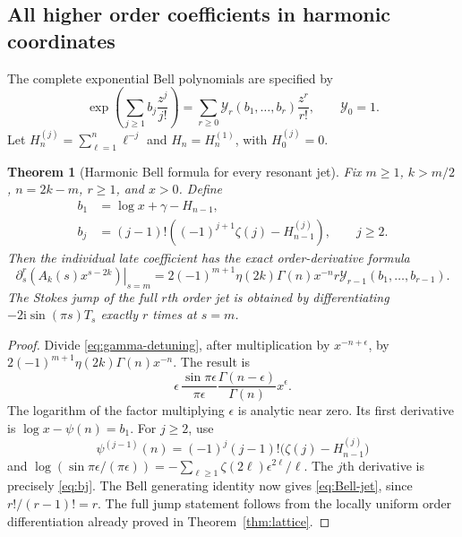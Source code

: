 \documentclass[11pt,a4paper]{article}
\newtheorem{theorem}{Theorem}[section]
\theoremstyle{definition}\newtheorem{definition}[theorem]{Definition}
\theoremstyle{remark}\newtheorem{remark}[theorem]{Remark}
\newcommand{\Bell}{\mathcal Y}
\newcommand{\ii}{\mathrm i}
\numberwithin{equation}{section}
\begin{document}
\subsection{All higher order coefficients in harmonic coordinates}

The complete exponential Bell polynomials are specified by
\begin{equation}\label{eq:Bell-def}
 \exp\left(\sum_{j\ge1}b_j\frac{z^j}{j!}\right)
       =\sum_{r\ge0}\Bell_r(b_1,\ldots,b_r)\frac{z^r}{r!},
 \qquad \Bell_0=1.
\end{equation}
Let $H_n^{(j)}=\sum_{\ell=1}^n\ell^{-j}$ and $H_n=H_n^{(1)}$, with
$H_0^{(j)}=0$.

\begin{theorem}[Harmonic Bell formula for every resonant jet]\label{thm:Bell}
Fix $m\ge1$, $k>m/2$, $n=2k-m$, $r\ge1$, and $x>0$. Define
\begin{align}
 b_1&=\log x+\gamma-H_{n-1},\label{eq:b1}\\
 b_j&=(j-1)!\left((-1)^{j+1}\zeta(j)-H_{n-1}^{(j)}\right),
                  \qquad j\ge2.\label{eq:bj}
\end{align}
Then the individual late coefficient has the exact order-derivative formula
\begin{equation}\label{eq:Bell-jet}
 \left.\partial_s^r\!\left(A_k(s)x^{s-2k}\right)\right|_{s=m}
  =2(-1)^{m+1}\eta(2k)\Gamma(n)x^{-n}
       r\Bell_{r-1}(b_1,\ldots,b_{r-1}).
\end{equation}
The Stokes jump of the full $r$th order jet is obtained by differentiating
$-2\ii\sin(\pi s)T_s$ exactly $r$ times at $s=m$.
\end{theorem}
\begin{proof}
Divide \eqref{eq:gamma-detuning}, after multiplication by $x^{-n+\epsilon}$,
by $2(-1)^{m+1}\eta(2k)\Gamma(n)x^{-n}$. The result is
\[
 \epsilon\,\frac{\sin\pi\epsilon}{\pi\epsilon}
        \frac{\Gamma(n-\epsilon)}{\Gamma(n)}x^\epsilon.
\]
The logarithm of the factor multiplying $\epsilon$ is analytic near zero.
Its first derivative is $\log x-\psi(n)=b_1$.
For $j\ge2$, use
\[
 \psi^{(j-1)}(n)=(-1)^j(j-1)!
               \bigl(\zeta(j)-H_{n-1}^{(j)}\bigr)
\]
and
$\log(\sin\pi\epsilon/(\pi\epsilon))
 =-\sum_{\ell\ge1}\zeta(2\ell)\epsilon^{2\ell}/\ell$.
The $j$th derivative is precisely \eqref{eq:bj}.
The Bell generating identity now gives \eqref{eq:Bell-jet}, since
$r!/(r-1)!=r$. The full jump statement follows from the locally uniform
order differentiation already proved in Theorem~\ref{thm:lattice}.
\end{proof}
\end{document}
